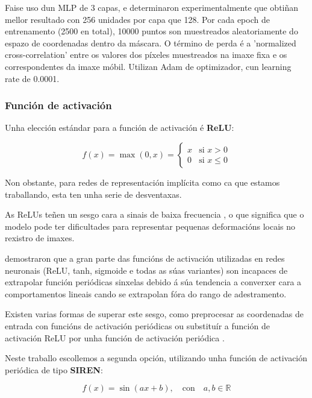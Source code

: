 Faise uso dun MLP de 3 capas, e determinaron experimentalmente que obtiñan mellor resultado con 256 unidades por capa que 128.
Por cada epoch de entrenamento (2500 en total), 10000 puntos son muestreados aleatoriamente do espazo de coordenadas dentro da máscara.
O término de perda é a 'normalized cross-correlation' entre os valores dos píxeles muestreados na imaxe fixa e os correspondentes da imaxe móbil.
Utilizan Adam de optimizador, cun learning rate de 0.0001.

\subsubsection{Función de activación}
\label{subsubsec:Función de activación}

Unha elección estándar para a función de activación é \textbf{ReLU}:

\[
f(x) = \max(0, x) = \begin{cases} 
x & \text{si } x > 0 \\ 
0 & \text{si } x \leq 0 
\end{cases}
\]

Non obstante, para redes de representación implícita como ca que estamos traballando, esta ten unha serie de desventaxas.

As ReLUs teñen un sesgo cara a sinais de baixa frecuencia \cite{rahaman2019spectralbiasneuralnetworks}, 
 o que significa que o modelo pode ter dificultades para representar pequenas deformacións locais no rexistro de imaxes.
 
\cite{ziyin2020neuralnetworksfaillearn} demostraron que a gran parte das funcións de activación utilizadas en redes neuronais (ReLU, tanh, sigmoide e todas as súas variantes)
son incapaces de extrapolar función periódicas sinxelas debido á súa tendencia a converxer cara a comportamentos lineais cando se extrapolan fóra do rango de adestramento. 

Existen varias formas de superar este sesgo, como preprocesar as coordenadas de entrada con funcións de activación periódicas \cite{mildenhall2020nerfrepresentingscenesneural} 
ou substituír a función de activación ReLU por unha función de activación periódica \cite{sitzmann2020implicitneuralrepresentationsperiodic}.

Neste traballo escollemos a segunda opción, utilizando unha función de activación periódica de tipo \textbf{SIREN}:

\[
f(x) = \sin(ax + b), \quad \text{con} \quad a, b \in \mathbb{R}
\]

